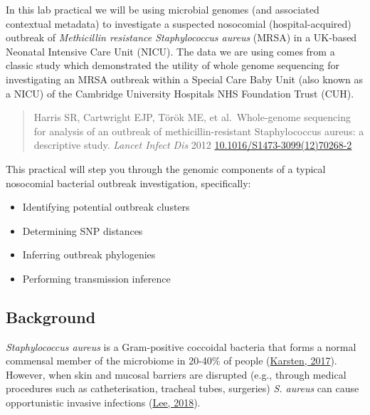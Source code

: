 \documentclass[
]{book}
\providecommand{\tightlist}{%
  \setlength{\itemsep}{0pt}\setlength{\parskip}{0pt}}
\begin{document}
In this lab practical we will be using microbial genomes (and associated contextual metadata) to investigate a suspected nosocomial (hospital-acquired) outbreak of \emph{Methicillin resistance Staphylococcus aureus} (MRSA) in a UK-based Neonatal Intensive Care Unit (NICU). The data we are using comes from a classic study which demonstrated the utility of whole genome sequencing for investigating an MRSA outbreak within a Special Care Baby Unit (also known as a NICU) of the Cambridge University Hospitals NHS Foundation Trust (CUH).

\begin{quote}
Harris SR, Cartwright EJP, Török ME, et al.~Whole-genome sequencing for analysis of an outbreak of methicillin-resistant Staphylococcus aureus: a descriptive study. \emph{Lancet Infect Dis} 2012 \href{http://dx.doi.org/10.1016/S1473-3099(12)70268-2}{10.1016/S1473-3099(12)70268-2}
\end{quote}

This practical will step you through the genomic components of a typical nosocomial bacterial outbreak investigation, specifically:

\begin{itemize}
\tightlist
\item
  Identifying potential outbreak clusters
\item
  Determining SNP distances
\item
  Inferring outbreak phylogenies
\item
  Performing transmission inference
\end{itemize}

\subsection{Background}\label{intro1}

\emph{Staphylococcus aureus} is a Gram-positive coccoidal bacteria that forms a normal commensal member of the microbiome in 20-40\% of people (\href{https://doi.org/10.1016/j.ijmm.2016.11.007}{Karsten, 2017}). However, when skin and mucosal barriers are disrupted (e.g., through medical procedures such as catheterisation, tracheal tubes, surgeries) \emph{S. aureus} can cause opportunistic invasive infections (\href{https://doi.org/10.1038/nrdp.2018.33}{Lee, 2018}).
\end{document}
